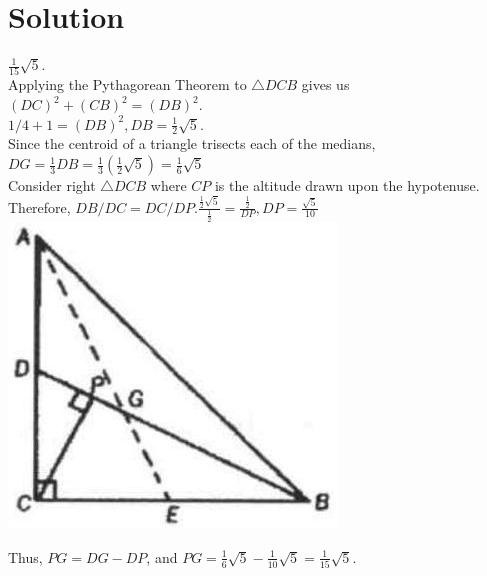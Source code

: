 \documentclass{article}
\begin{document}
\section*{Solution}
\(\frac{1}{15} \sqrt{5}\).\\
Applying the Pythagorean Theorem to \(\triangle D C B\) gives us\\
\((D C)^{2}+(C B)^{2}=(D B)^{2}\).\\
\(1 / 4+1=(D B)^{2}, D B=\frac{1}{2} \sqrt{5}\).\\
Since the centroid of a triangle trisects each of the medians,\\
\(D G=\frac{1}{3} D B=\frac{1}{3}\left(\frac{1}{2} \sqrt{5}\right)=\frac{1}{6} \sqrt{5}\)\\
Consider right \(\triangle D C B\) where \(C P\) is the altitude drawn upon the hypotenuse.\\
Therefore, \(D B / D C=D C / D P . \frac{\frac{1}{2} \sqrt{5}}{\frac{1}{2}}=\frac{\frac{1}{2}}{D P}, D P=\frac{\sqrt{5}}{10}\)\\
\centering
\includegraphics[width=\textwidth]{images/reasoning_image_1.jpg}

Thus, \(P G=D G-D P\), and \(P G=\frac{1}{6} \sqrt{5}-\frac{1}{10} \sqrt{5}=\frac{1}{15} \sqrt{5}\).
\end{document}
